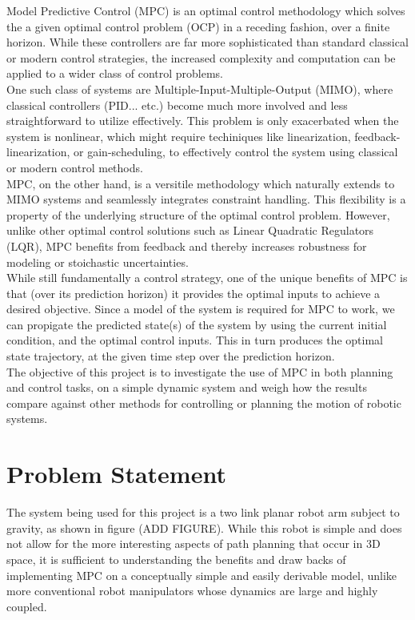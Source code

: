 \documentclass[journal]{IEEEtran}
\begin{document}
Model Predictive Control (MPC) is an optimal control methodology which solves the a given optimal control problem (OCP) in a receding fashion, over a finite horizon. While these controllers are far more sophisticated than standard classical or modern control strategies, the increased complexity and computation can be applied to a wider class of control problems. \\

One such class of systems are Multiple-Input-Multiple-Output (MIMO), where classical controllers (PID... etc.) become much more involved and less straightforward to utilize effectively. This problem is only exacerbated when the system is nonlinear, which might require techiniques like linearization, feedback-linearization, or gain-scheduling, to effectively control the system using classical or modern control methods. \\

MPC, on the other hand, is a versitile methodology which naturally extends to MIMO systems and seamlessly integrates constraint handling. This flexibility is a property of the underlying structure of the optimal control problem. However, unlike other optimal control solutions such as Linear Quadratic Regulators (LQR), MPC benefits from feedback and thereby increases robustness for modeling or stoichastic uncertainties.  \\

While still fundamentally a control strategy, one of the unique benefits of MPC is that (over its prediction horizon) it provides the optimal inputs to achieve a desired objective. Since a model of the system is required for MPC to work, we can propigate the predicted state(s) of the system by using the current initial condition, and the optimal control inputs. This in turn produces the optimal state trajectory, at the given time step over the prediction horizon. \\

The objective of this project is to investigate the use of MPC in both planning and control tasks, on a simple dynamic system and weigh how the results compare against other methods for controlling or planning the motion of robotic systems.


\section{Problem Statement}

The system being used for this project is a two link planar robot arm subject to gravity, as shown in figure (ADD FIGURE). While this robot is simple and does not allow for the more interesting aspects of path planning that occur in 3D space, it is sufficient to understanding the benefits and draw backs of implementing MPC on a conceptually simple and easily derivable model, unlike more conventional robot manipulators whose dynamics are large and highly coupled.
\end{document}
